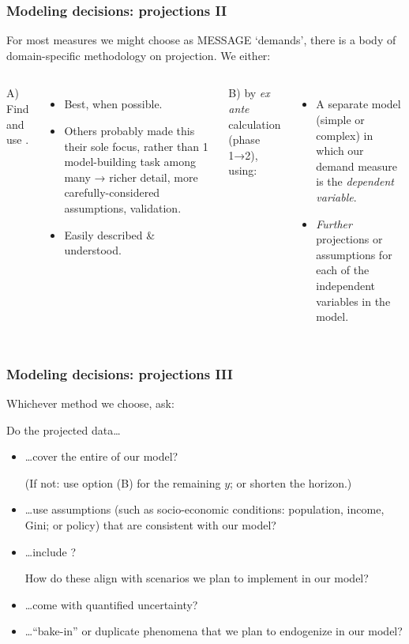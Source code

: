 \documentclass[12pt,aspectratio=169]{beamer}
\begin{document}
\begin{frame}
\frametitle{Modeling decisions: projections II}
For most measures we might choose as MESSAGE ‘demands’, there is a body of domain-specific methodology on projection. We either:

\bigskip
\begin{columns}[T]
A) Find and use .
\begin{itemize}
  \item Best, when possible.
  \item Others probably made this their sole focus, rather than 1 model-building task among many → richer detail, more carefully-considered assumptions, validation.
  \item Easily described \& understood.
\end{itemize}

B)  by \emph{ex ante} calculation (phase 1→2), using:
\begin{itemize}
  \item A separate model (simple or complex) in which our demand measure is the \emph{dependent variable}.
  \item \emph{Further} projections or assumptions for each of the independent variables in the model.
\end{itemize}

\end{columns}
\end{frame}

\begin{frame}
\frametitle{Modeling decisions: projections III}
Whichever method we choose, ask:

\bigskip
Do the projected data…

\smallskip
\begin{itemize}[<+->]
  \item …cover the entire  of our model?

  (If not: use option (B) for the remaining $y$; or shorten the horizon.)
  \item …use assumptions (such as socio-economic conditions: population, income, Gini; or policy) that are consistent with our model?
  \item …include ?

  How do these align with scenarios we plan to implement in our model?
  \item …come with quantified uncertainty?
  \item …“bake-in” or duplicate phenomena that we plan to endogenize in our model?
\end{itemize}

\end{frame}
\end{document}
